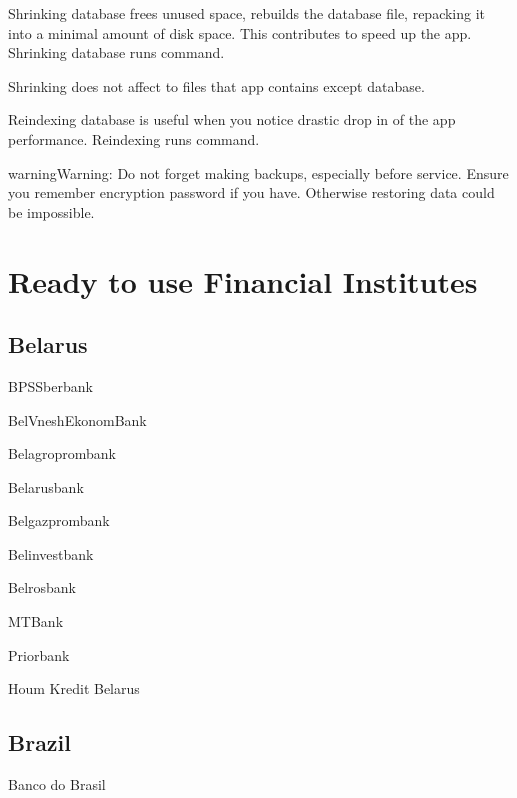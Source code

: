 \documentclass[a4paper,10pt,english]{sphinxmanual}
\begin{document}
\noindent{}

\sphinxAtStartPar
Shrinking database frees unused space, rebuilds the database file, repacking it into a minimal
amount of disk space. This contributes to speed up the app. Shrinking database runs
 command.

\sphinxAtStartPar
Shrinking does not affect to files that app contains except database.

\sphinxAtStartPar
Reindexing database is useful when you notice drastic drop in of the app performance.
Reindexing runs  command.

\begin{sphinxadmonition}{warning}{Warning:}
\sphinxAtStartPar
Do not forget making backups, especially before service. Ensure you remember encryption password if you have. Otherwise restoring data could be impossible.
\end{sphinxadmonition}

\sphinxstepscope


\chapter{Ready to use Financial Institutes}
\label{\detokenize{banks:ready-to-use-financial-institutes}}\label{\detokenize{banks:chapter-supported-banks}}\label{\detokenize{banks::doc}}

\section{Belarus}
\label{\detokenize{banks:belarus}}
\sphinxAtStartPar
BPSSberbank

\sphinxAtStartPar
BelVneshEkonomBank

\sphinxAtStartPar
Belagroprombank

\sphinxAtStartPar
Belarusbank

\sphinxAtStartPar
Belgazprombank

\sphinxAtStartPar
Belinvestbank

\sphinxAtStartPar
Belrosbank

\sphinxAtStartPar
MTBank

\sphinxAtStartPar
Priorbank

\sphinxAtStartPar
Houm Kredit Belarus


\section{Brazil}
\label{\detokenize{banks:brazil}}
\sphinxAtStartPar
Banco do Brasil
\end{document}
